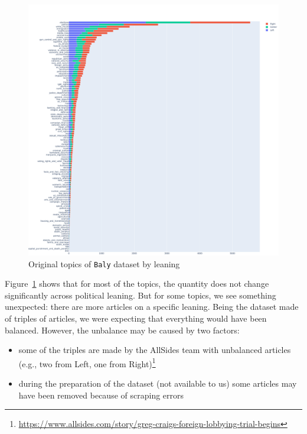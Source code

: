 \begin{figure}[!htbp]
    \centering
    \includegraphics[width=\linewidth]{figures/baly_original_topics_by_leaning.pdf}
    \caption{Original topics of \texttt{Baly} dataset by leaning}
    \label{fig:baly_original_topics_by_leaning}
\end{figure}
 

Figure~\ref{fig:baly_original_topics_by_leaning} shows that for most of the topics, the quantity does not change significantly across political leaning.
But for some topics, we see something unexpected: there are more articles on a specific leaning. Being the dataset made of triples of articles, we were expecting that everything would have been balanced.
However, the unbalance may be caused by two factors:
\begin{itemize}
    \item some of the triples are made by the AllSides team with unbalanced articles (e.g., two from Left, one from Right)\footnote{\url{https://www.allsides.com/story/greg-craigs-foreign-lobbying-trial-begins}}
    \item during the preparation of the dataset (not available to us) some articles may have been removed because of scraping errors
\end{itemize}

